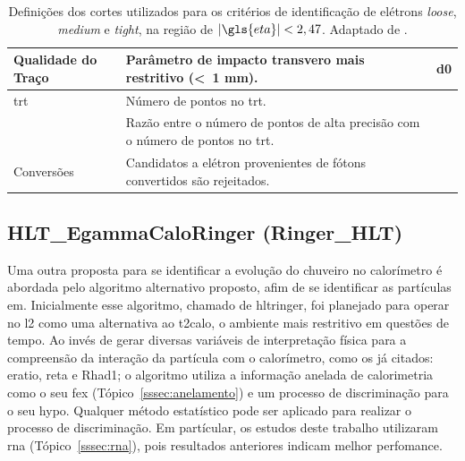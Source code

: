 \begin{table}
{\begin{tabular}{p{4cm}p{9cm}c}
\hline
Qualidade do Traço & Parâmetro de impacto transvero mais restritivo (<~1 mm).  & \gls{d0} \\
\hline
\gls{trt} & Número de pontos no \gls{trt}. & \\
 & Razão entre o número de pontos de alta precisão com o número de pontos no
\gls{trt}. & \\
\hline
Conversões & Candidatos a elétron provenientes de fótons convertidos são
rejeitados. & \\
\hline
\hline
\end{tabular}
}
\caption[Definições dos cortes utilizados para os critérios de identificação de elétrons \emph{loose}, \emph{medium}
e \emph{tight}, na região de $|\eta|<2,47$]
{Definições dos cortes utilizados para os critérios de identificação de elétrons \emph{loose}, \emph{medium}
e \emph{tight}, na região de $|\gls{eta}|<2,47$. Adaptado de \cite{expected_perf_2011}.}
\label{tab:cortes_em}
\end{table}

\subsection{HLT\_EgammaCaloRinger (Ringer\_HLT)}
\label{ssec:hlt_ringer}


Uma outra proposta para se identificar a evolução do chuveiro no calorímetro é 
abordada pelo algoritmo alternativo proposto, afim de se identificar as partículas \gls{em}. 
Inicialmente esse algoritmo, chamado de \gls{hltringer}, foi planejado para operar no
\acrlong{l2} como uma alternativa ao \gls{t2calo}, o ambiente mais restritivo 
em questões de tempo. Ao invés de gerar diversas variáveis de interpretação física 
para a compreensão da interação da partícula com o calorímetro, como os já
citados: \gls{eratio}, \gls{reta} e \gls{Rhad1}; o algoritmo utiliza a informação anelada
de calorimetria como o seu \gls{fex} (Tópico~\ref{sssec:anelamento}) 
e um processo de discriminação para o seu \gls{hypo}. Qualquer método estatístico 
pode ser aplicado para realizar o processo de discriminação. 
Em partícular, os estudos deste trabalho utilizaram \gls{rna}
(Tópico~\ref{sssec:rna}), pois resultados anteriores indicam melhor perfomance.


